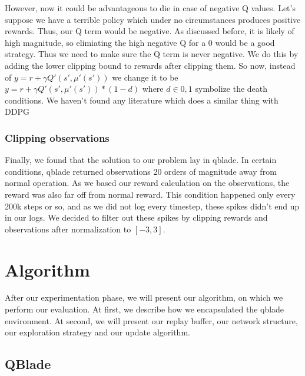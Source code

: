 \documentclass[hyperref,beleg]{cgvpub}
\begin{document}
However, now it could be advantageous to die in case of negative Q values. Let's suppose we have a terrible policy which under no circumstances produces positive rewards. Thus, our Q term would be negative. As discussed before, it is likely of high magnitude, so elimiating the high negative Q for a 0 would be a good strategy. Thus we need to make sure the Q term is never negative. We do this by adding the lower clipping bound to rewards after clipping them. So now, instead of $y = r + \gamma Q'(s', \mu'(s'))$ we change it to be $y = r + \gamma Q'(s', \mu'(s')) * (1-d)$ where $d \in {0, 1}$ symbolize the death conditions. We haven't found any literature which does a similar thing with \ac{DDPG}

\subsection{Clipping observations}

Finally, we found that the solution to our problem lay in qblade. In certain conditions, qblade returned observations 20 orders of magnitude away from normal operation. As we based our reward calculation on the observations, the reward was also far off from normal reward. This condition happened only every 200k steps or so, and as we did not log every timestep, these spikes didn't end up in our logs. We decided to filter out these spikes by clipping rewards and observations after normalization to $[-3, 3]$.

\chapter{Algorithm}

After our experimentation phase, we will present our algorithm, on which we perform our evaluation. At first, we describe how we encapsulated the qblade environment. At second, we will present our replay buffer, our network structure, our exploration strategy and our update algorithm.

\section{QBlade}

\label{sec:alg_qblade}
\end{document}
